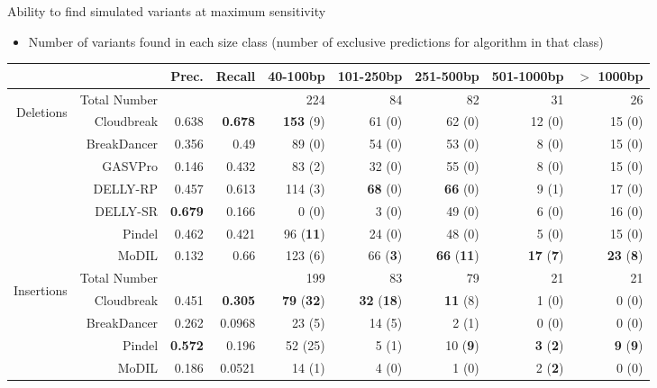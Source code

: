 \documentclass{beamer}
\begin{document}
\begin{frame}{Ability to find simulated variants at maximum sensitivity}
\begin{itemize}
\item Number of variants found in each size class (number of
  exclusive predictions for algorithm in that class)
\end{itemize}
\begin{center}
\fontsize{6pt}{10}\selectfont
\begin{tabular}{r|rrr|rrrrr}
  \cline{2-9}
   &                     & Prec. & Recall & 40-100bp  & 101-250bp  & 251-500bp & 501-1000bp & $>$ 1000bp \\ 
\hline
\multirow{7}{*}{\begin{sideways}Deletions\end{sideways}} & Total Number &          &           & 224 &  84 & 82 &  31 & 26\\ 
  \hline
\cline{2-9}
&  Cloudbreak    &  0.638 & \textbf{0.678} & \textbf{153} (9)  & 61 (0) &  62 (0) & 12 (0) & 15 (0) \\ 
&  BreakDancer   &  0.356 & 0.49 & 89 (0)  & 54 (0) &  53 (0) & 8 (0) & 15 (0) \\ 
&  GASVPro        & 0.146 & 0.432 & 83 (2)  & 32 (0) &  55 (0) & 8 (0) & 15 (0) \\ 
&  DELLY-RP           & 0.457 & 0.613 & 114 (3)  & \textbf{68} (0) &  \textbf{66} (0) & 9 (1) & 17 (0) \\ 
&  DELLY-SR           & \textbf{0.679} & 0.166 & 0 (0)  & 3 (0) &  49 (0) & 6 (0) & 16 (0) \\ 
&  Pindel           & 0.462 & 0.421 & 96 (\textbf{11})  & 24 (0) &  48 (0) & 5 (0) & 15 (0)\\ 
&  MoDIL           & 0.132  & 0.66 & 123 (6)  & 66 (\textbf{3}) &  \textbf{66} (\textbf{11}) & \textbf{17} (\textbf{7}) & \textbf{23} (\textbf{8})\\ 
   \hline
\multirow{5}{*}{\begin{sideways}Insertions\end{sideways}} & Total Number &          &           & 199 &  83 & 79 &  21 & 21\\ 
\cline{2-9}
&  Cloudbreak   &0.451 & \textbf{0.305}  & \textbf{79} (\textbf{32})  & \textbf{32} (\textbf{18}) &  \textbf{11} (8) & 1 (0) & 0 (0) \\ 
&  BreakDancer & 0.262 & 0.0968  & 23 (5)  & 14 (5) &  2 (1) & 0 (0) & 0 (0) \\ 
&  Pindel          & \textbf{0.572} & 0.196 & 52 (25)  & 5 (1) &  10 (\textbf{9}) & \textbf{3} (\textbf{2}) & \textbf{9} (\textbf{9})\\ 
&  MoDIL          & 0.186 & 0.0521 & 14 (1)  & 4 (0) &  1 (0) & 2 (\textbf{2}) & 0 (0)\\ 
\hline
\end{tabular}
\end{center}
\end{frame}
\end{document}
